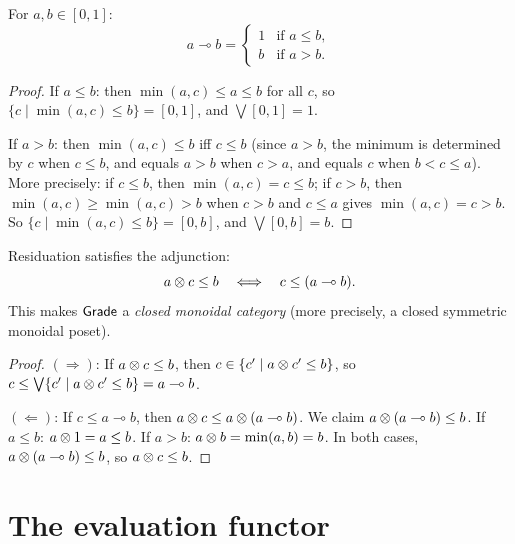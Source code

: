 \begin{proposition}
\label{prop:residuation-compute}
For $a, b \in [0, 1]$:
\[
  a \multimap b =
  \begin{cases}
    1 & \text{if } a \leq b, \\
    b & \text{if } a > b.
  \end{cases}
\]
\end{proposition}

\begin{proof}
If $a \leq b$: then $\min(a, c) \leq a \leq b$ for all $c$, so
$\{c \mid \min(a, c) \leq b\} = [0, 1]$, and $\bigvee [0,1] = 1$.

If $a > b$: then $\min(a, c) \leq b$ iff $c \leq b$ (since
$a > b$, the minimum is determined by $c$ when $c \leq b$, and equals
$a > b$ when $c > a$, and equals $c$ when $b < c \leq a$).  More
precisely: if $c \leq b$, then $\min(a, c) = c \leq b$; if $c > b$,
then $\min(a, c) \geq \min(a, c) > b$ when $c > b$ and $c \leq a$ gives
$\min(a,c) = c > b$.  So $\{c \mid \min(a, c) \leq b\} = [0, b]$, and
$\bigvee [0, b] = b$.
\end{proof}

\begin{proposition}
\label{prop:residuation-adjunction}
Residuation satisfies the adjunction:
\[
  a \otimes c \leq b \quad \Longleftrightarrow \quad c \leq (a \multimap b).
\]
This makes $\mathsf{Grade}$ a \emph{closed monoidal category} (more precisely,
a closed symmetric monoidal poset).
\end{proposition}

\begin{proof}
$(\Rightarrow)$: If $a \otimes c \leq b$, then
$c \in \{c' \mid a \otimes c' \leq b\}$, so $c \leq \bigvee\{c' \mid a \otimes c' \leq b\} = a \multimap b$.

$(\Leftarrow)$: If $c \leq a \multimap b$, then
$a \otimes c \leq a \otimes (a \multimap b)$.  We claim
$a \otimes (a \multimap b) \leq b$.  If $a \leq b$: $a \otimes 1 = a \leq b$.
If $a > b$: $a \otimes b = \min(a, b) = b$.  In both cases,
$a \otimes (a \multimap b) \leq b$, so $a \otimes c \leq b$.
\end{proof}



\section{The evaluation functor}
\label{sec:grade:evaluation}

